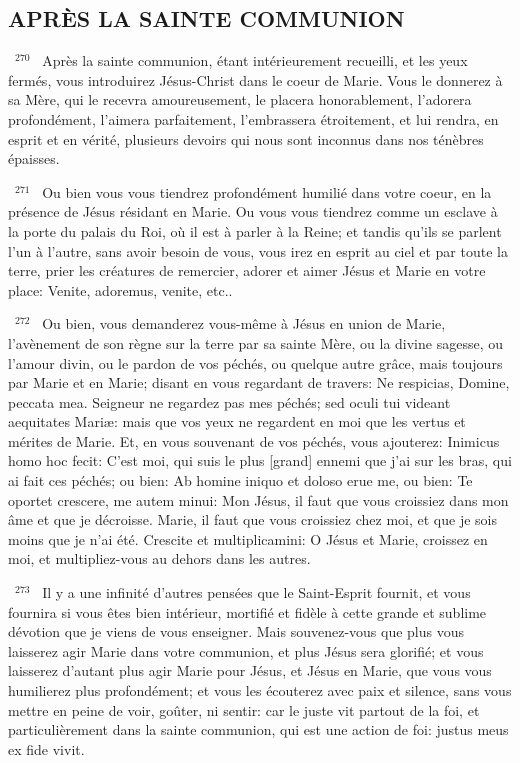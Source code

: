 \documentclass[paper=a5,pagesize=pdftex,fontsize=15pt,headinclude=on,twoside=off]{scrbook}
\newcommand{\negphantom}[1]{\settowidth{\dimen0}{#1}\hspace*{-\dimen0}}
\newcommand{\versenb}[1]{\par \vspace{10pt}~\negphantom{~${}^{#1}$~}${}^{#1}$~}
\begin{document}
\subsection{APRÈS LA SAINTE COMMUNION}
\versenb{270} Après la sainte communion, étant intérieurement recueilli, et les yeux fermés, vous introduirez Jésus-Christ
dans le coeur de Marie. Vous le donnerez à sa Mère, qui le recevra amoureusement, le placera honorablement,
l'adorera profondément, l'aimera parfaitement, l'embrassera étroitement, et lui rendra, en esprit et en vérité,
plusieurs devoirs qui nous sont inconnus dans nos ténèbres épaisses.
\versenb{271} Ou bien vous vous tiendrez profondément humilié dans votre coeur, en la présence de Jésus résidant en
Marie. Ou vous vous tiendrez comme un esclave à la porte du palais du Roi, où il est à parler à la Reine; et tandis
qu'ils se parlent l'un à l'autre, sans avoir besoin de vous, vous irez en esprit au ciel et par toute la terre, prier les
créatures de remercier, adorer et aimer Jésus et Marie en votre place: Venite, adoremus, venite, etc..
\versenb{272} Ou bien, vous demanderez vous-même à Jésus en union de Marie, l'avènement de son règne sur la terre par
sa sainte Mère, ou la divine sagesse, ou l'amour divin, ou le pardon de vos péchés, ou quelque autre grâce, mais
toujours par Marie et en Marie; disant en vous regardant de travers: Ne respicias, Domine, peccata mea. Seigneur
ne regardez pas mes péchés; sed oculi tui videant aequitates Mariæ: mais que vos yeux ne regardent en moi que
les vertus et mérites de Marie. Et, en vous souvenant de vos péchés, vous ajouterez: Inimicus homo hoc fecit:
C'est moi, qui suis le plus [grand] ennemi que j'ai sur les bras, qui ai fait ces péchés; ou bien: Ab homine iniquo et
doloso erue me, ou bien: Te oportet crescere, me autem minui: Mon Jésus, il faut que vous croissiez dans mon
âme et que je décroisse. Marie, il faut que vous croissiez chez moi, et que je sois moins que je n'ai été. Crescite et
multiplicamini: O Jésus et Marie, croissez en moi, et multipliez-vous au dehors dans les autres.
\versenb{273} Il y a une infinité d'autres pensées que le Saint-Esprit fournit, et vous fournira si vous êtes bien intérieur,
mortifié et fidèle à cette grande et sublime dévotion que je viens de vous enseigner. Mais souvenez-vous que plus
vous laisserez agir Marie dans votre communion, et plus Jésus sera glorifié; et vous laisserez d'autant plus agir
Marie pour Jésus, et Jésus en Marie, que vous vous humilierez plus profondément; et vous les écouterez avec
paix et silence, sans vous mettre en peine de voir, goûter, ni sentir: car le juste vit partout de la foi, et
particulièrement dans la sainte communion, qui est une action de foi: justus meus ex fide vivit.
\end{document}
